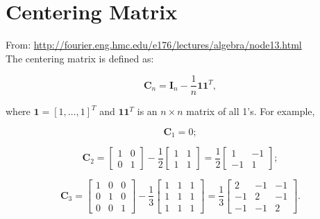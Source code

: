 \documentclass[10pt,b5paper,titlepage]{book}
\begin{document}
\chapter{Centering Matrix}

From: \url{http://fourier.eng.hmc.edu/e176/lectures/algebra/node13.html}\\

The centering matrix is defined as:

\begin{equation}
    \mathbf{C}_{n} = \mathbf{I}_{n} - \frac{1}{n}\mathbf{1}\mathbf{1}^{T}
,\end{equation}

where $\mathbf{1} = [1, \ldots , 1]^{T}$ and $\mathbf{1}\mathbf{1}^{T}$
is an $n \times n$ matrix of all 1's. For example,

\begin{equation}
    \mathbf{C}_{1} = 0
;\end{equation}

\begin{equation}
    \mathbf{C}_{2} =
    \begin{bmatrix}
        1 & 0 \\
        0 & 1
    \end{bmatrix}
    - \frac{1}{2}
    \begin{bmatrix}
        1 & 1 \\
        1 & 1
    \end{bmatrix}
    = \frac{1}{2}\begin{bmatrix}
         1 & -1 \\
        -1 &  1
    \end{bmatrix}
;\end{equation}

\begin{equation}
    \mathbf{C}_{3} = \begin{bmatrix}
        1 & 0 & 0 \\
        0 & 1 & 0 \\
        0 & 0 & 1
    \end{bmatrix}
    - \frac{1}{3} \begin{bmatrix}
        1 & 1 & 1 \\
        1 & 1 & 1 \\
        1 & 1 & 1
    \end{bmatrix}
    = \frac{1}{3} \begin{bmatrix}
        2 & -1 & -1 \\
        -1 & 2 & -1 \\
        -1 & -1 & 2
    \end{bmatrix}
.\end{equation}
\end{document}
